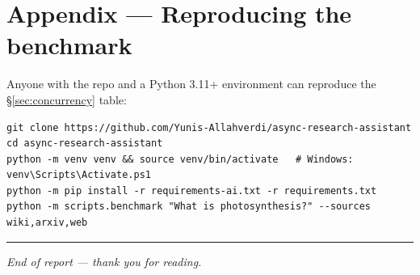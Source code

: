\documentclass[11pt,a4paper]{article}
\begin{document}
\appendix
\section{Appendix --- Reproducing the benchmark}
Anyone with the repo and a Python 3.11+ environment can reproduce the \S\ref{sec:concurrency}
table:

\begin{lstlisting}[style=plain]
git clone https://github.com/Yunis-Allahverdi/async-research-assistant
cd async-research-assistant
python -m venv venv && source venv/bin/activate   # Windows: venv\Scripts\Activate.ps1
python -m pip install -r requirements-ai.txt -r requirements.txt
python -m scripts.benchmark "What is photosynthesis?" --sources wiki,arxiv,web
\end{lstlisting}

\vspace{1em}\hrule\vspace{0.6em}
\noindent\small\textit{End of report --- thank you for reading.}
\end{document}
